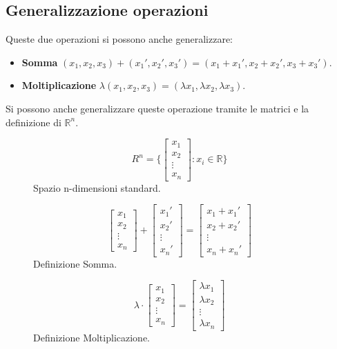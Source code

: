 \subsection{Generalizzazione operazioni}
Queste due operazioni si possono anche generalizzare:
\begin{itemize}
    \item \textbf{Somma} $(x_1, x_2, x_3) + (x_1', x_2', x_3') = (x_1 + x_1', x_2 + x_2', x_3 + x_3')$.
    \item \textbf{Moltiplicazione} $\lambda(x_1, x_2, x_3) = (\lambda x_1, \lambda x_2, \lambda x_3)$.
\end{itemize}
Si possono anche generalizzare queste operazione tramite le matrici e la definizione di $\mathbb{R}^n$.
\begin{figure}[h!]
    \vspace{-12pt}
    \centering
    \begin{minipage}{.3\linewidth}
    \centering
    \[
    R^n = \Bigg\{ \begin{bmatrix}x_1\\x_2\\ \vdots \\ x_n\end{bmatrix} : x_i \in \mathbb{R} \Bigg\}
    \]
    Spazio n-dimensioni standard.
    \end{minipage}
    \begin{minipage}{.3\linewidth}
    \centering
    \[
    \begin{bmatrix}x_1\\x_2\\ \vdots \\ x_n\end{bmatrix} + \begin{bmatrix}x_1'\\x_2'\\ \vdots \\ x_n'\end{bmatrix} = \begin{bmatrix}x_1 + x_1'\\x_2 + x_2'\\ \vdots \\ x_n + x_n'\end{bmatrix}
    \] 
    Definizione Somma.
    \end{minipage}
    \begin{minipage}{.3\linewidth}
    \centering
    \[
    \lambda \cdot \begin{bmatrix}x_1\\x_2\\ \vdots \\ x_n\end{bmatrix} = \begin{bmatrix}\lambda x_1\\ \lambda x_2\\ \vdots \\ \lambda x_n\end{bmatrix}
    \]
    Definizione Moltiplicazione.
    \end{minipage}
\end{figure}

